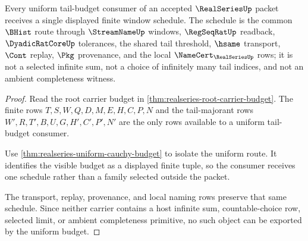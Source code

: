 \begin{theorem}
\label{thm:realseries-uniform-tail-budget}
Every uniform tail-budget consumer of an accepted $\RealSeriesUp$ packet receives a single displayed finite window schedule. The schedule is the common $\BHist$ route through $\StreamNameUp$ windows, $\RegSeqRatUp$ readback, $\DyadicRatCoreUp$ tolerances, the shared tail threshold, $\hsame$ transport, $\Cont$ replay, $\Pkg$ provenance, and the local $\NameCert_{\RealSeriesUp}$ rows; it is not a selected infinite sum, not a choice of infinitely many tail indices, and not an ambient completeness witness.
\end{theorem}
\begin{proof}
Read the root carrier budget in \autoref{thm:realseries-root-carrier-budget}. The finite rows $T,S,W,Q,D,M,E,H,C,P,N$ and the tail-majorant rows $W',R,T',B,U,G,H',C',P',N'$ are the only rows available to a uniform tail-budget consumer.

Use \autoref{thm:realseries-uniform-cauchy-budget} to isolate the uniform route. It identifies the visible budget as a displayed finite tuple, so the consumer receives one schedule rather than a family selected outside the packet.

The transport, replay, provenance, and local naming rows preserve that same schedule. Since neither carrier contains a host infinite sum, countable-choice row, selected limit, or ambient completeness primitive, no such object can be exported by the uniform budget.
\end{proof}

